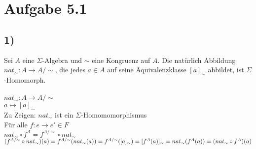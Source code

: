 \section*{Aufgabe 5.1}
\subsection*{1)}
Sei $A$ eine $\Sigma$-Algebra und $\sim$ eine Kongruenz auf $A$. Die natürlich Abbildung $nat_\sim:A\rightarrow A/\sim$, die jedes $a\in A$ auf seine Äquivalenzklasse $[a]_\sim$ abbildet, ist $\Sigma$-Homomorph.\\
\\
$nat_\sim:A\rightarrow A/\sim$\\
$a\mapsto [a]_\sim$\\
Zu Zeigen: $nat_\sim$ ist ein $\Sigma$-Homomomorphismus\\
Für alle $f:e\rightarrow e' \in F$\\
$nat_\sim\circ f^A = f^{A/\sim}\circ nat_\sim$\\
$(f^{A/\sim}\circ nat_\sim)(a) = f^{A/\sim}(nat_\sim(a)) \\
= f^{A/\sim}([a]_\sim)=[f^A(a)]_\sim=nat_\sim(f^A(a))=(nat_\sim\circ f^A)(a)$
